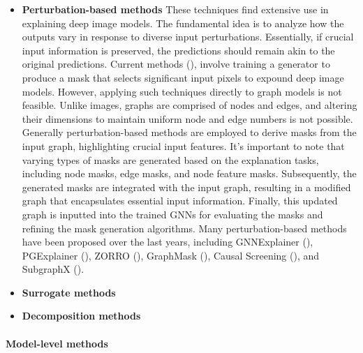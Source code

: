 \documentclass[binding=0.6cm]{sapthesis}
\newcommand{\mycite}[1]{(\cite{#1})}
\begin{document}
\begin{itemize}
    \item \textbf{Perturbation-based methods} These techniques find extensive use in explaining deep image models. The fundamental idea is to analyze how the outputs vary in response to diverse input perturbations. Essentially, if crucial input information is preserved, the predictions should remain akin to the original predictions. Current methods \mycite{dabkowski2017-saliency,yuan2020-discrete-masks,chen2018-learning}, involve training a generator to produce a mask that selects significant input pixels to expound deep image models. However, applying such techniques directly to graph models is not feasible. Unlike images, graphs are comprised of nodes and edges, and altering their dimensions to maintain uniform node and edge numbers is not possible. Generally perturbation-based methods are employed to derive masks from the input graph, highlighting crucial input features. It's important to note that varying types of masks are generated based on the explanation tasks, including node masks, edge masks, and node feature masks. Subsequently, the generated masks are integrated with the input graph, resulting in a modified graph that encapsulates essential input information. Finally, this updated graph is inputted into the trained GNNs for evaluating the masks and refining the mask generation algorithms. Many perturbation-based methods have been proposed over the last years, including GNNExplainer \mycite{ying2019-gnnexplainer}, PGExplainer \mycite{luo2020-pgexplainer}, ZORRO \mycite{funke2021-hard}, GraphMask \mycite{schlichtkrull2022-interpreting}, Causal Screening \mycite{wang2021-causal}, and SubgraphX \mycite{yuan2021-subgraphx}.
    
    \item \textbf{Surrogate methods}
    
    \item \textbf{Decomposition methods}
    
\end{itemize}

\paragraph{Model-level methods}
\label{sec:bg.xai.model-level}
\end{document}
